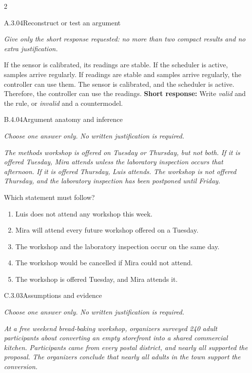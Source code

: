\documentclass[9pt]{extarticle}
\newcommand{\choice}[1]{\item #1}
\begin{document}
\CoreWorkArea
\FormBreak
{}
\begin{multicols}{2}
\begin{DenseCoreProblem}{A.3.04}{Reconstruct or test an argument}
{\scriptsize\textit{Give only the short response requested: no more than two compact results and no extra justification.}\par}
If the sensor is calibrated, its readings are stable. If the scheduler is active, samples arrive regularly. If readings are stable and samples arrive regularly, the controller can use them. The sensor is calibrated, and the scheduler is active. Therefore, the controller can use the readings.
\textbf{Short response:} Write \emph{valid} and the rule, or \emph{invalid} and a countermodel.
\end{DenseCoreProblem}
\begin{DenseCoreProblem}{B.4.04}{Argument anatomy and inference}
{\scriptsize\textit{Choose one answer only. No written justification is required.}\par}
\emph{The methods workshop is offered on Tuesday or Thursday, but not both. If it is offered Tuesday, Mira attends unless the laboratory inspection occurs that afternoon. If it is offered Thursday, Luis attends. The workshop is not offered Thursday, and the laboratory inspection has been postponed until Friday.}

Which statement must follow?
\begin{enumerate}[label=(\alph*)]
  \choice{Luis does not attend any workshop this week.}
  \choice{Mira will attend every future workshop offered on a Tuesday.}
  \choice{The workshop and the laboratory inspection occur on the same day.}
  \choice{The workshop would be cancelled if Mira could not attend.}
  \choice{The workshop is offered Tuesday, and Mira attends it.}
\end{enumerate}
\end{DenseCoreProblem}
\columnbreak
\begin{DenseCoreProblem}{C.3.03}{Assumptions and evidence}
{\scriptsize\textit{Choose one answer only. No written justification is required.}\par}
\emph{At a free weekend bread-baking workshop, organizers surveyed 240 adult participants about converting an empty storefront into a shared commercial kitchen. Participants came from every postal district, and nearly all supported the proposal. The organizers conclude that nearly all adults in the town support the conversion.}


\end{DenseCoreProblem}
\end{multicols}
\end{document}
